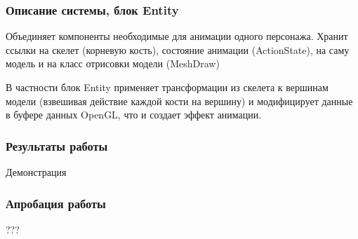 \documentclass{beamer}
\begin{document}
\begin{frame}
\frametitle{Описание системы, блок Entity}
    Объединяет компоненты необходимые для анимации одного персонажа. Хранит ссылки на скелет (корневую кость), состояние анимации (ActionState), на саму модель и на класс отрисовки модели (MeshDraw)
    
    \medskip
    В частности блок Entity применяет трансформации из скелета к вершинам модели (взвешивая действие каждой кости на вершину) и модифицирует данные в буфере данных OpenGL, что и создает эффект анимации.

\end{frame}




\begin{frame}
\frametitle{Результаты работы}
    \begin{center}            
    \begin{large}
    Демонстрация
    \end{large}
    \end{center}
\end{frame}



\begin{frame}
\frametitle{Апробация работы}
    \begin{center}            
    \begin{large}
    ???
    \end{large}
    \end{center}
\end{frame}
\end{document}
